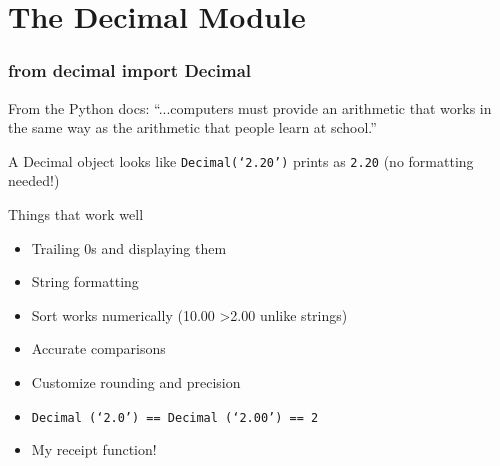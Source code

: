 \documentclass{beamer}
\begin{document}
\section{The Decimal Module}

\begin{frame}\frametitle{from decimal import Decimal}
\begin{block}{From the Python docs:}
``...computers must provide an arithmetic that works in the same way as the arithmetic that people learn at school.''
\end{block}
\pause
\begin{block}{A Decimal object looks like}
\texttt{Decimal(`2.20')} prints as \texttt{2.20} (no formatting needed!)
\end{block}
\pause
\begin{block}{Things that work well}
\begin{itemize}
\item Trailing 0s and displaying them
\item String formatting
\item Sort works numerically (10.00 \textgreater 2.00 unlike strings)
\item Accurate comparisons
\item Customize rounding and precision
\item \texttt{Decimal (`2.0') == Decimal (`2.00') == 2}
\item My receipt function!
\end{itemize}
\end{block}
\end{frame}
\end{document}
